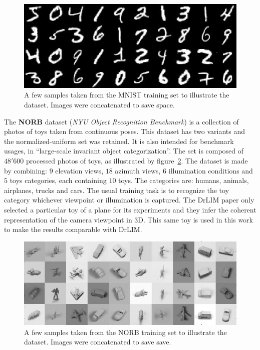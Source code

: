 \documentclass[a4paper,12pt]{report}
\begin{document}
\begin{figure}[t]
    \begin{center}
        \includegraphics{thesis_figures/mnist.jpg}
    \end{center}
    \caption{A few samples taken from the MNIST training set to illustrate the dataset. Images were concatenated to save space.}
    \label{fig:mnist}
\end{figure}

The {\bf NORB} dataset ({\em NYU Object Recognition Benchmark}) is a collection of photos of toys taken from continuous poses.
This dataset has two variants and the normalized-uniform set was retained.
It is also intended for benchmark usages, in ``large-scale invariant object categorization''.
The set is composed of $48'600$ processed photos of toys, as illustrated by figure~\ref{fig:norb}.
The dataset is made by combining: $9$ elevation views, $18$ azimuth views, $6$ illumination conditions and $5$ toys categories, each containing $10$ toys.
The categories are: humans, animals, airplanes, trucks and cars.
The usual training task is to recognize the toy category whichever viewpoint or illumination is captured.
The DrLIM paper only selected a particular toy of a plane for its experiments and they infer the coherent representation of the camera viewpoint in 3D.
This same toy is used in this work to make the results comparable with DrLIM.

\begin{figure}[t]
    \begin{center}
        \includegraphics{thesis_figures/norb.jpg}
    \end{center}
    \caption{A few samples taken from the NORB training set to illustrate the dataset. Images were concatenated to save save.}
    \label{fig:norb}
\end{figure}
\end{document}
